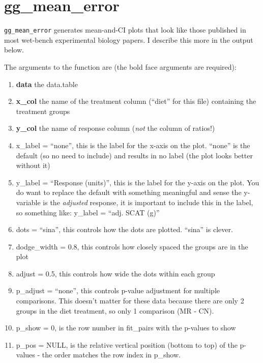 \documentclass[]{book}
\providecommand{\tightlist}{%
  \setlength{\itemsep}{0pt}\setlength{\parskip}{0pt}}
\begin{document}
\hypertarget{gg_mean_error}{%
\section{gg\_mean\_error}\label{gg_mean_error}}

\texttt{gg\_mean\_error} generates mean-and-CI plots that look like those published in most wet-bench experimental biology papers. I describe this more in the output below.

The arguments to the function are (the bold face arguments are required):

\begin{enumerate}
\def\labelenumi{\arabic{enumi}.}
\tightlist
\item
  \textbf{data} the data.table
\item
  \textbf{x\_col} the name of the treatment column (``diet'' for this file) containing the treatment groups
\item
  \textbf{y\_col} the name of response column (\emph{not} the column of ratios!)
\item
  x\_label = ``none'', this is the label for the x-axis on the plot. ``none'' is the default (so no need to include) and results in no label (the plot looks better without it)
\item
  y\_label = ``Response (units)'', this is the label for the y-axis on the plot. You do want to replace the default with something meaningful and sense the y-variable is the \emph{adjusted} response, it is important to include this in the label, so something like: y\_label = ``adj. SCAT (g)''
\item
  dots = ``sina'', this controls how the dots are plotted. ``sina'' is clever.
\item
  dodge\_width = 0.8, this controls how closely spaced the groups are in the plot
\item
  adjust = 0.5, this controls how wide the dots within each group
\item
  p\_adjust = ``none'', this controls p-value adjustment for multiple comparisons. This doesn't matter for these data because there are only 2 groups in the diet treatment, so only 1 comparison (MR - CN).
\item
  p\_show = 0, is the row number in fit\_pairs with the p-values to show
\item
  p\_pos = NULL, is the relative vertical position (bottom to top) of the p-values - the order matches the row index in p\_show.
\end{enumerate}
\end{document}
